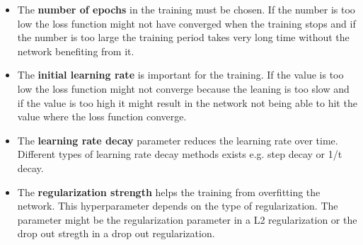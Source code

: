\begin{itemize}
	\item The \textbf{number of epochs} in the training must be chosen. If the number is too low the loss function might not have converged when the training stops and if the number is too large the training period takes very long time without the network benefiting from it.
	\item The \textbf{initial learning rate} is important for the training. If the value is too low the loss function might not converge because the leaning is too slow and if the value is too high it might result in the network not being able to hit the value where the loss function converge.
	\item The \textbf{learning rate decay} parameter reduces the learning rate over time. Different types of learning rate decay methods exists e.g. step decay or 1/t decay.
	\item The \textbf{regularization strength} helps the training from overfitting
	the network. This hyperparameter depends on the type of regularization. The
	parameter might be the regularization parameter in a L2 regularization or the
	drop out stregth in a drop out regularization.
\end{itemize} 


